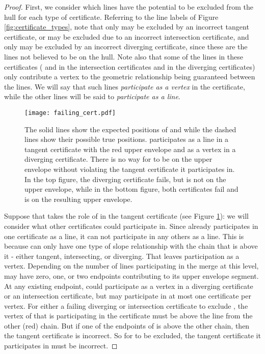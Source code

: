\documentclass[11pt]{article}
\begin{document}
\begin{proof} 
First, we consider which lines have the potential to be excluded from the hull for each type of certificate.  Referring to the line labels of Figure \ref{fig:certificate_types}, note that only  may be excluded by an incorrect tangent certificate,  or  may be excluded due to an incorrect intersection certificate, and only  may be excluded by an incorrect diverging certificate, since these are the lines not believed to be on the hull.  Note also that some of the lines in these certificates ( and  in the intersection certificates and  in the diverging certificates) only contribute a vertex to the geometric relationship being guaranteed between the lines.  We will say that such lines \emph{participate as a vertex} in the certificate, while the other lines will be said to \emph{participate as a line}.

\begin{figure}[htbp]
   \centering
   \texttt{[image: failing\_cert.pdf]} \caption{The solid lines show the expected positions of  and  while the dashed lines show their possible true positions.   participates as a line in a tangent certificate with the red upper envelope and as a vertex in a diverging certificate.  There is no way for  to be on the upper envelope without violating the tangent certificate it participates in.  In the top figure, the diverging certificate fails, but  is not on the upper envelope, while in the bottom figure, both certificates fail and  is on the resulting upper envelope.}
   \label{fig:failing_cert}
\end{figure}

   Suppose that  takes the role of  in the tangent certificate (see Figure \ref{fig:failing_cert}): we will consider what other certificates  could participate in.  Since  already participates in one certificate as a line, it can not participate in any others as a line.  This is because  can only have one type of slope relationship with the chain that is above it - either tangent, intersecting, or diverging.
That leaves participation as a vertex.  Depending on the number of lines participating in the merge at this level,  may have zero, one, or two endpoints contributing to its upper envelope segment. 
At any existing endpoint,  could participate as a vertex in a diverging certificate or an intersection certificate, but may participate in at most one certificate per vertex.  For either a failing diverging or intersection certificate to exclude , the vertex of  that is participating in the certificate must be above the line from the other (red) chain.  But if one of the endpoints of  is above the other chain, then the tangent certificate is incorrect.  So for  to be excluded, the tangent certificate it participates in must be incorrect.


\end{proof}
\end{document}
